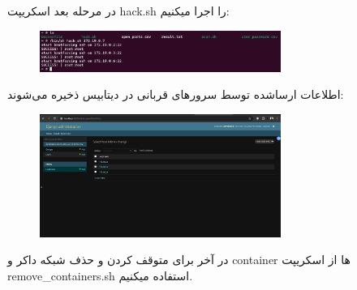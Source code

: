 \documentclass{article}
\begin{document}
در مرحله بعد اسکریپت hack.sh را اجرا میکنیم:
\begin{figure}[ht]
\centering
\includegraphics[width=0.7\textwidth]{images/hack.jpg}
\end{figure}
\newpage
اطلاعات ارسا‌شده توسط سرورهای قربانی در دیتابیس ذخیره می‌شوند:
\begin{figure}[ht]
\centering
\includegraphics[width=0.7\textwidth]{images/ws.jpg}
\end{figure}


در آخر برای متوقف کردن و حذف شبکه داکر و container ها از اسکریپت remove\_containers.sh استفاده میکنیم.
\end{document}
